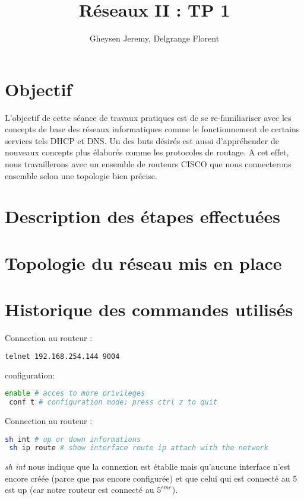 \documentclass[10pt,a4paper]{article}
\author{Gheysen Jeremy, Delgrange Florent}
\title{Réseaux II : TP 1}
\begin{document}
\maketitle

\section{Objectif}

L'objectif de cette séance de travaux pratiques est de se re-familiariser avec les concepts de base des réseaux informatiques comme le fonctionnement de certains services tels DHCP et DNS. Un des buts désirés est aussi d'appréhender de nouveaux concepts plus élaborés comme les protocoles de routage. A cet effet, nous travaillerons avec un ensemble de routeurs CISCO que nous connecterons ensemble selon une topologie bien précise.  

\section{Description des étapes effectuées}

\section{Topologie du réseau mis en place}

\section{Historique des commandes utilisés}

\noindent Connection au routeur :
\begin{lstlisting}[language=bash]
 telnet 192.168.254.144 9004
\end{lstlisting}

\noindent configuration:
\begin{lstlisting}[language=bash]
 enable # acces to more privileges
 conf t # configuration mode; press ctrl z to quit 
\end{lstlisting}

\noindent Connection au routeur :
\begin{lstlisting}[language=bash]
 sh int # up or down informations
 sh ip route # show interface route ip attach with the network
\end{lstlisting}

\textit{sh int} nous indique que la connexion est établie mais qu'aucune interface n'est encore créée (parce que pas encore configurée) et que celui qui est connecté au $5$ est up (car notre routeur est connecté au $5^{eme}$).
\end{document}
